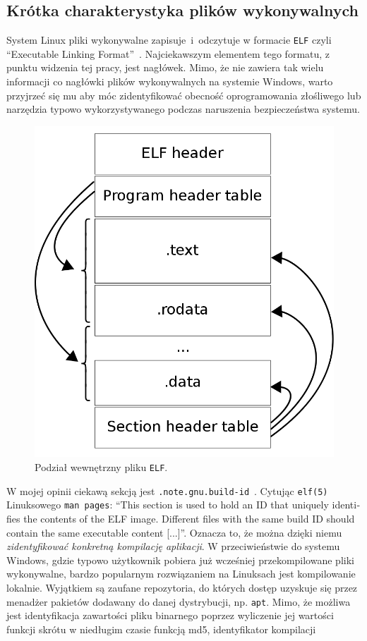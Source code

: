 \subsection{Krótka charakterystyka plików wykonywalnych}
System Linux pliki wykonywalne zapisuje~i~odczytuje w formacie \texttt{ELF} czyli 
\foreignquote{english}{Executable Linking Format}~\cite{linux_foundation_tool_nodate}.
Najciekawszym elementem tego formatu, z punktu widzenia tej pracy, jest nagłówek. Mimo, że nie zawiera tak wielu informacji co
nagłówki plików wykonywalnych na systemie Windows, warto przyjrzeć się mu aby móc zidentyfikować obecność
oprogramowania złośliwego lub narzędzia typowo wykorzystywanego podczas naruszenia bezpieczeństwa systemu.
\begin{figure}[H]
    \centering
    \includegraphics[width=0.45\linewidth]{rysunki/elf.png}
    \caption{Podział wewnętrzny pliku \texttt{ELF}\protect\footnotemark.}
    \label{fig:enter-label}
\end{figure}
W mojej opinii ciekawą sekcją jest \texttt{.note.gnu.build-id}~\cite{elfman}. Cytując
\texttt{elf(5)} Linuksowego \texttt{man pages}: \foreignquote{english}{This section is used to hold an ID that uniquely
identifies the contents of the ELF image.  Different files
with the same build ID should contain the same executable
content [...]}. Oznacza to, że można dzięki niemu \emph{zidentyfikować konkretną kompilację aplikacji}.
W przeciwieństwie do systemu Windows, gdzie typowo użytkownik pobiera już wcześniej przekompilowane pliki wykonywalne,
bardzo popularnym rozwiązaniem na Linuksach jest kompilowanie lokalnie. Wyjątkiem są zaufane repozytoria, do których dostęp
uzyskuje się przez menadżer pakietów dodawany do danej dystrybucji, np. \texttt{apt}. Mimo, że możliwa jest identyfikacja 
zawartości pliku binarnego poprzez wyliczenie jej wartości funkcji skrótu w niedługim czasie funkcją md5, identyfikator kompilacji
